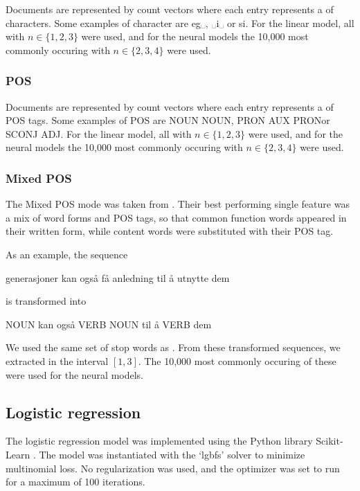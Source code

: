Documents are represented by count vectors where each entry represents a
\ngram of characters. Some examples of character \ngrams are \textlangle
eg␣\textrangle, \textlangle␣i␣\textrangle\xspace or \textlangle si\textrangle. For
the linear model, all \ngrams with $n\in \{1,2,3\}$ were used, and for the
neural models the 10,000 most commonly occuring \ngrams with $n\in \{2,3,4\}$
were used.

\subsubsection*{POS \ngrams}

Documents are represented by count vectors where each entry represents a
\ngram of POS tags. Some examples of POS \ngrams are \textlangle NOUN
NOUN\textrangle, \textlangle PRON AUX PRON\textrangle or \textlangle SCONJ
ADJ\textrangle. For the linear model, all \ngrams with $n\in \{1,2,3\}$ were
used, and for the neural models the 10,000 most commonly occuring \ngrams
with $n\in \{2,3,4\}$ were used.

\subsubsection*{Mixed POS}

The Mixed POS mode was taken from \textcite{malmasi15}. Their best performing
single feature was a mix of word forms and POS tags, so that common function
words appeared in their written form, while content words were substituted
with their POS tag.

As an example, the sequence 
\begin{displayquote}
generasjoner kan også få anledning til å utnytte dem
\end{displayquote}
is transformed into
\begin{displayquote}
NOUN kan også VERB NOUN til å VERB dem
\end{displayquote}

We used the same set of stop words as \citeauthor{malmasi15}. From these
transformed sequences, we extracted \ngrams in the interval $[1,3]$. The
10,000 most commonly occuring of these were used for the neural models.


\subsection{Logistic regression}

The logistic regression model was implemented using the Python library
Scikit-Learn \autocite{scikit-learn}. The model was instantiated with the
`lgbfs' solver to minimize multinomial loss. No regularization was used, and
the optimizer was set to run for a maximum of 100 iterations.


